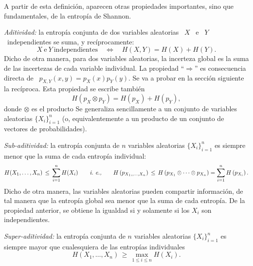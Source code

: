 A partir de esta definici\'on,  aparecen otras propiedades importantes, sino que
fundamentales, de la entrop\'ia de Shannon.
%
\begin{propiedades}
\item\label{Prop:SZ:aditividad} {\it Aditividad:}  la entrop\'ia conjunta de dos
  variables aleatorias  \ $X$  \ e \  $Y$ \ independientes se  suma, y
  rec\'iprocamente:
  \[
  X \: \mbox{e} \: Y \: \mbox{independientes} \quad \Leftrightarrow \quad H(X,Y)
  =  H(X) +  H(Y).
  \]
  Dicho de otra manera, para dos variables aleatorias, la incerteza global es la
  suma   de  las  incertezas   de  cada   variable  individual.    La  propiedad
  ``$\Rightarrow$'' es consecuencia directa de \ $p_{X,Y}(x,y) = p_X(x) p_Y(y)$.
  Se va  a probar en  la secci\'on siguiente  la rec\'iproca. Esta  propiedad se
  escribe tambi\'en
  \[
  H\left( p_X \otimes p_Y \right) = H\left( p_X \right) + H\left( p_Y \right),
  \]
  donde  $\otimes$ es el  producto 
  Se  generaliza sencillamente  a un  conjunto de  variables aleatorias  $\{ X_i
  \}_{i=1}^n$ (o, equivalentemente a  un producto  de un conjunto
  de vectores de probabilidades).
%
\item\label{Prop:SZ:subaditividad} {\it  Sub-aditividad:} la entrop\'ia conjunta
  de $n$ variables  aleatorias $\{ X_i \}_{i=1}^n$ es siempre  menor que la suma
  de cada entrop\'ia individual:
  \[
  H(X_1,\ldots,X_n)  \,  \le \,  \sum_{i=1}^n  H(X_i)  \qquad \mbox{{\it i.~e.,}}  \qquad
  H\left(  p_{X_1,, \ldots  , X_n}  \right) \,  \le \,  H\left(  p_{X_1} \otimes
    \cdots \otimes p_{X_n} \right) = \sum_{i=1}^n H\left( p_{X_i} \right).
  \]
  Dicho de otra manera, las variables aleatorias pueden compartir informaci\'on,
  de  tal  manera que  la  entrop\'ia  global sea  menor  que  la  suma de  cada
  entrop\'ia.  De la  propiedad anterior, se obtiene la  igualdad si y solamente
  si los $X_i$ son independientes.
%
\item\label{Prop:SZ:superaditividad}   {\it  Super-aditividad:}   la  entrop\'ia
  conjunta de $n$ variables aleatorias  $\{ X_i \}_{i=1}^n$ es siempre mayor que
  cualesquiera de las entrop\'ias individuales
  \[
  H(X_1,\ldots,X_n) \, \ge \, \max_{1 \le i \le n} H(X_i).
  \]
\end{propiedades}

